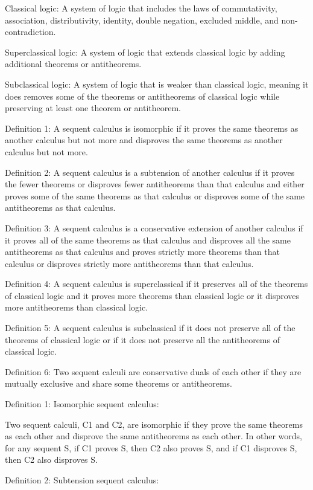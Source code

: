 Classical logic: A system of logic that includes the laws of commutativity, association, distributivity, identity, double negation, excluded middle, and non-contradiction.

Superclassical logic: A system of logic that extends classical logic by adding additional theorems or antitheorems.

Subclassical logic: A system of logic that is weaker than classical logic, meaning it does removes some of the theorems or antitheorems of classical logic while preserving at least one theorem or antitheorem.

Definition 1: A sequent calculus is isomorphic if it proves the same theorems as another calculus but not more and disproves the same theorems as another calculus but not more.

Definition 2: A sequent calculus is a subtension of another calculus if it proves the fewer theorems or disproves fewer antitheorems than that calculus and either proves some of the same theorems as that calculus or disproves some of the same antitheorems as that calculus.

Definition 3: A sequent calculus is a conservative extension of another calculus if it proves all of the same theorems as that calculus and disproves all the same antitheorems as that calculus and proves strictly more theorems than that calculus or disproves strictly more antitheorems than that calculus.

Definition 4: A sequent calculus is superclassical if it preserves all of the theorems of classical logic and it proves more theorems than classical logic or it disproves more antitheorems than classical logic.

Definition 5: A sequent calculus is subclassical if it does not preserve all of the theorems of classical logic or if it does not preserve all the antitheorems of classical logic.

Definition 6: Two sequent calculi are conservative duals of each other if they are mutually exclusive and share some theorems or antitheorems.

Definition 1: Isomorphic sequent calculus:

Two sequent calculi, C1 and C2, are isomorphic if they prove the same theorems as each other and disprove the same antitheorems as each other. In other words, for any sequent S, if C1 proves S, then C2 also proves S, and if C1 disproves S, then C2 also disproves S.

Definition 2: Subtension sequent calculus:

